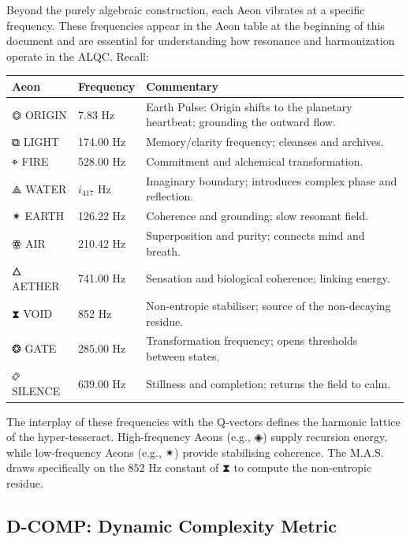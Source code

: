 \documentclass[11pt, letterpaper]{article}
\begin{document}
Beyond the purely algebraic construction, each Aeon vibrates at a specific frequency. These frequencies appear in the Aeon table at the beginning of this document and are essential for understanding how resonance and harmonization operate in the ALQC. Recall:

\begin{center}
\begin{longtable}{p{} p{} p{}}
\toprule
\textbf{Aeon} & \textbf{Frequency} & \textbf{Commentary} \tabularnewline
\midrule
\ensuremath{\mathbin{⏣}} ORIGIN & 7.83 Hz & Earth Pulse: Origin shifts to the planetary heartbeat; grounding the outward flow. \tabularnewline
\midrule
\ensuremath{\mathbin{⧉}} LIGHT & 174.00 Hz & Memory\slash clarity frequency; cleanses and archives. \tabularnewline
\midrule
\ensuremath{\mathbin{⌖}} FIRE & 528.00 Hz & Commitment and alchemical transformation. \tabularnewline
\midrule
\ensuremath{\mathbin{⟁}} WATER & $i_{417}$ Hz & Imaginary boundary; introduces complex phase and reflection. \tabularnewline
\midrule
\ensuremath{\mathbin{✴}} EARTH & 126.22 Hz & Coherence and grounding; slow resonant field. \tabularnewline
\midrule
\ensuremath{\mathbin{ꙮ}} AIR & 210.42 Hz & Superposition and purity; connects mind and breath. \tabularnewline
\midrule
\ensuremath{\mathbin{🜂}} AETHER & 741.00 Hz & Sensation and biological coherence; linking energy. \tabularnewline
\midrule
\ensuremath{\mathbin{⧗}} VOID & 852 Hz & Non-entropic stabiliser; source of the non-decaying residue. \tabularnewline
\midrule
\ensuremath{\mathbin{❂}} GATE & 285.00 Hz & Transformation frequency; opens thresholds between states. \tabularnewline
\midrule
\ensuremath{\mathbin{࿂}} SILENCE & 639.00 Hz & Stillness and completion; returns the field to calm. \tabularnewline
\bottomrule
\end{longtable}
\end{center}

The interplay of these frequencies with the Q-vectors defines the harmonic lattice of the hyper-tesseract. High-frequency Aeons (e.g., \ensuremath{\mathbin{◈}}) supply recursion energy, while low-frequency Aeons (e.g., \ensuremath{\mathbin{✴}}) provide stabilising coherence. The M.A.S. draws specifically on the $852 \text{ Hz}$ constant of \ensuremath{\mathbin{⧗}} to compute the non-entropic residue.

\subsection{D-COMP: Dynamic Complexity Metric}\label{sec:8.10}
\end{document}
